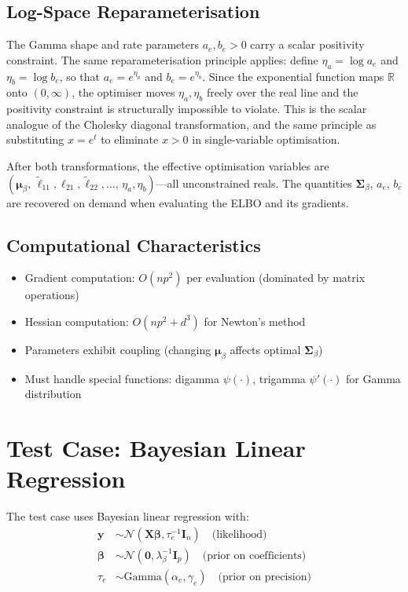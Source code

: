 \documentclass[11pt]{article}
\newcommand{\R}{\mathbb{R}}
\newcommand{\N}{\mathcal{N}}
\begin{document}
\subsection*{Log-Space Reparameterisation}

The Gamma shape and rate parameters $a_e, b_e > 0$ carry a scalar positivity constraint. The same reparameterisation principle applies: define $\eta_a = \log a_e$ and $\eta_b = \log b_e$, so that $a_e = e^{\eta_a}$ and $b_e = e^{\eta_b}$. Since the exponential function maps $\R$ onto $(0, \infty)$, the optimiser moves $\eta_a, \eta_b$ freely over the real line and the positivity constraint is structurally impossible to violate. This is the scalar analogue of the Cholesky diagonal transformation, and the same principle as substituting $x = e^t$ to eliminate $x > 0$ in single-variable optimisation.

After both transformations, the effective optimisation variables are $(\bm{\mu}_\beta,\, \tilde{\ell}_{11}, \ell_{21}, \tilde{\ell}_{22}, \ldots,\, \eta_a, \eta_b)$---all unconstrained reals. The quantities $\bm{\Sigma}_\beta$, $a_e$, $b_e$ are recovered on demand when evaluating the ELBO and its gradients.

\subsection*{Computational Characteristics}

\begin{itemize}
\item Gradient computation: $O(np^2)$ per evaluation (dominated by matrix operations)
\item Hessian computation: $O(np^2 + d^3)$ for Newton's method
\item Parameters exhibit coupling (changing $\bm{\mu}_\beta$ affects optimal $\bm{\Sigma}_\beta$)
\item Must handle special functions: digamma $\psi(\cdot)$, trigamma $\psi'(\cdot)$ for Gamma distribution
\end{itemize}
\newpage
\section*{Test Case: Bayesian Linear Regression}

The test case uses Bayesian linear regression with:
\begin{align}
\bm{y} &\sim \N(\bm{X}\bm{\beta}, \tau_e^{-1} \bm{I}_n) \quad \text{(likelihood)}\\
\bm{\beta} &\sim \N(\bm{0}, \lambda_\beta^{-1} \bm{I}_p) \quad \text{(prior on coefficients)}\\
\tau_e &\sim \text{Gamma}(\alpha_e, \gamma_e) \quad \text{(prior on precision)}
\end{align}
\end{document}
